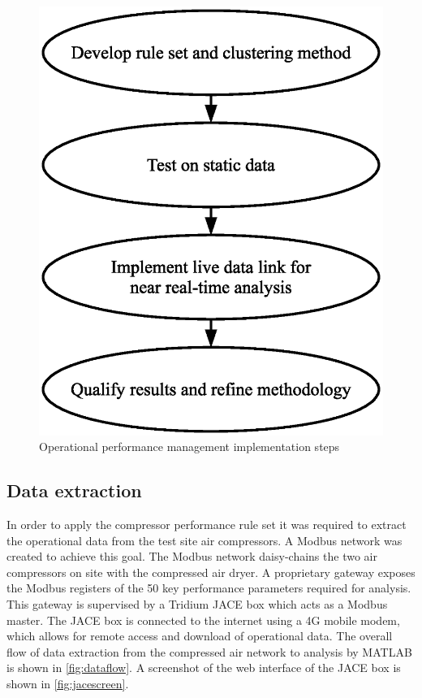 \begin{figure}
\includegraphics[width = .5\columnwidth]{./Images/ImplementationSteps.eps}
\caption{Operational performance management implementation steps}
\label{fig:implementationsteps}
\end{figure}

\subsection{Data extraction}
In order to apply the compressor performance rule set it was required to extract the operational data from the test site air compressors. A Modbus network was created to achieve this goal. The Modbus network daisy-chains the two air compressors on site with the compressed air dryer. A proprietary gateway exposes the Modbus registers of the 50 key performance parameters required for analysis. This gateway is supervised by a Tridium JACE box which acts as a Modbus master. The JACE box is connected to the internet using a 4G mobile modem, which allows for remote access and download of operational data. The overall flow of data extraction from the compressed air network to analysis by MATLAB is shown in \autoref{fig:dataflow}. A screenshot of the web interface of the JACE box is shown in \autoref{fig:jacescreen}.


